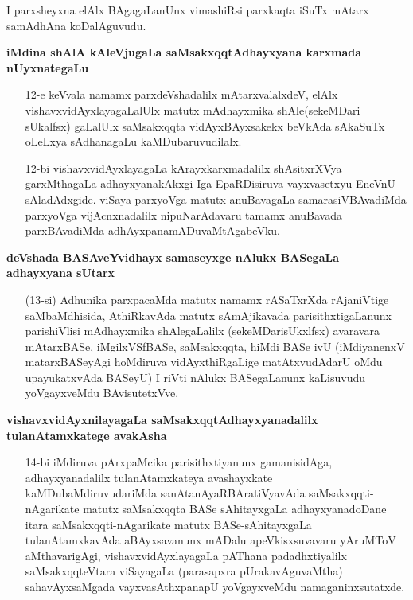 I parxsheyxna elAlx BAgagaLanUnx vimashiRsi parxkaqta iSuTx mAtarx samAdhAna koDalAguvudu.

\textbf{iMdina shAlA kAleVjugaLa saMsakxqqtAdhayxyana karxmada nUyxnategaLu}\label{page43}

\begin{itemize}
\item[12-e] keVvala namamx parxdeVshadalilx mAtarxvalalxdeV, elAlx vishavxvidAyxlayagaLalUlx matutx mAdhayxmika shAle(sekeMDari sUkalfsx) gaLalUlx saMsakxqqta vidAyxBAyxsakekx beVkAda sAkaSuTx oLeLxya sAdhanagaLu kaMDubaruvudilalx.

\item[12-bi] vishavxvidAyxlayagaLa kArayxkarxmadalilx shAsitxrXVya garxMthagaLa adhayxyanakAkxgi Iga EpaRDisiruva vayxvasetxyu EneVnU sAladAdxgide. viSaya parxyoVga matutx anuBavagaLa samarasiVBAvadiMda parxyoVga vijAcnxnadalilx nipuNarAdavaru tamamx anuBavada parxBAvadiMda adhAyxpanamADuvaMtAgabeVku.
\end{itemize}

\noindent
\textbf{deVshada BASAveYvidhayx samaseyxge nAlukx BASegaLa adhayxyana sUtarx}\label{page44}

\begin{itemize}
\item[(13-si)] Adhunika parxpacaMda matutx namamx rASaTxrXda rAjaniVtige saMbaMdhisida, AthiRkavAda matutx sAmAjikavada parisithxtigaLanunx parishiVlisi mAdhayxmika shAlegaLalilx (sekeMDarisUkxlfsx) avaravara mAtarxBASe, iMgilxVSfBASe, saMsakxqqta, hiMdi BASe ivU (iMdiyanenxV matarxBASeyAgi hoMdiruva vidAyxthiRgaLige matAtxvudAdarU oMdu upayukatxvAda BASeyU) I riVti nAlukx BASegaLanunx kaLisuvudu yoVgayxveMdu BAvisutetxVve.
\end{itemize}

\noindent
\textbf{vishavxvidAyxnilayagaLa saMsakxqqtAdhayxyanadalilx tulanAtamxkatege avakAsha}\label{page44}

\begin{itemize}
\item[14-bi] iMdiruva pArxpaMcika parisithxtiyanunx gamanisidAga, adhayxyanadalilx tulanAtamxkateya avashayxkate kaMDubaMdiruvudariMda sanAtanAyaRBAratiVyavAda saMsakxqqti-nAgarikate matutx saMsakxqqta BASe sAhitayxgaLa adhayxyanadoDane itara saMsakxqqti-nAgarikate matutx BASe-sAhitayxgaLa tulanAtamxkavAda aBAyxsavanunx mADalu apeVkisxsuvavaru yAruMToV aMthavarigAgi, vishavxvidAyxlayagaLa pAThana padadhxtiyalilx saMsakxqqteVtara viSayagaLa (parasapxra pUrakavAguvaMtha) sahavAyxsaMgada vayxvasAthxpanapU yoVgayxveMdu namaganinxsutatxde.
\end{itemize}

